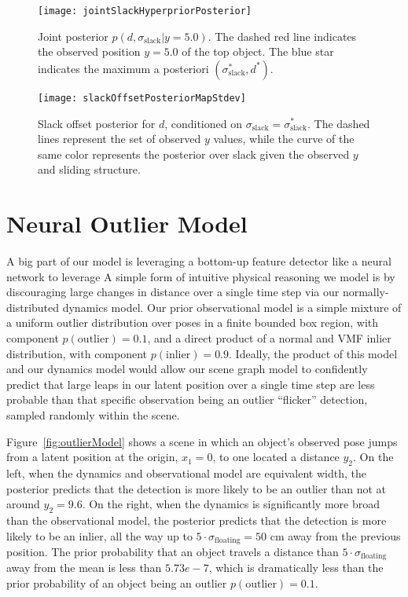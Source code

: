 \begin{figure}[H]
  \centering
  \texttt{[image: jointSlackHyperpriorPosterior]}
  \caption{
    Joint posterior $p(d,\sigma_\mathrm{slack} | y = 5.0)$.
    The dashed red line indicates the observed position $y = 5.0$ of the top object.
    The blue star indicates the maximum a posteriori $(\sigma_\mathrm{slack}^*, d^*)$.
  }
  \label{fig:jointSlackHyperpriorPosterior}
\end{figure}

\begin{figure}[H]
  \centering
  \texttt{[image: slackOffsetPosteriorMapStdev]}
  \caption{
    Slack offset posterior for $d$, conditioned on $\sigma_\mathrm{slack} = \sigma_\mathrm{slack}^*$.
    The dashed lines represent the set of observed $y$ values, while the curve of the same color represents the posterior over slack given the observed $y$ and sliding structure.
  }
  \label{fig:slackOffsetPosteriorMapStdev}
\end{figure}

\pagebreak

\section{Neural Outlier Model}
A big part of our model is leveraging a bottom-up feature detector like a neural network to leverage
A simple form of intuitive physical reasoning we model is by discouraging large changes in distance over a single time step via our normally-distributed dynamics model.
Our prior observational model is a simple mixture of a uniform outlier distribution over poses in a finite bounded box region, with component $p(\mathrm{outlier}) = 0.1$, and a direct product of a normal and VMF inlier distribution, with component $p(\mathrm{inlier}) = 0.9$.
Ideally, the product of this model and our dynamics model would allow our scene graph model to confidently predict that large leaps in our latent position over a single time step are less probable than that specific observation being an outlier ``flicker'' detection, sampled randomly within the scene.

Figure~\ref{fig:outlierModel} shows a scene in which an object's observed pose jumps from a latent position at the origin, $x_1 = 0$, to one located a distance $y_2$.
On the left, when the dynamics and observational model are equivalent width, the posterior predicts that the detection is more likely to be an outlier than not at around $y_2 = 9.6$.
On the right, when the dynamics is significantly more broad than the observational model, the posterior predicts that the detection is more likely to be an inlier, all the way up to $5 \cdot \sigma_\mathrm{floating} = 50$ cm away from the previous position.
The prior probability that an object travels a distance than $5 \cdot \sigma_\mathrm{floating}$ away from the mean is less than $5.73e-7$, which is dramatically less than the prior probability of an object being an outlier $p(\mathrm{outlier}) = 0.1$.


